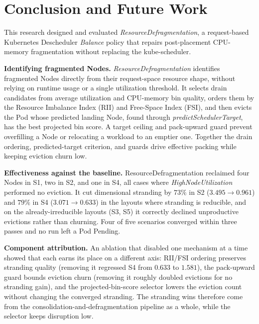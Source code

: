 \section{Conclusion and Future Work}
\label{bab:5}

This research designed and evaluated \textit{ResourceDefragmentation}, a request-based Kubernetes Descheduler \textit{Balance} policy that repairs post-placement CPU-memory fragmentation without replacing the kube-scheduler.

\textbf{Identifying fragmented Nodes.} \textit{ResourceDefragmentation} identifies fragmented Nodes directly from their request-space resource shape, without relying on runtime usage or a single utilization threshold. It selects drain candidates from average utilization and CPU-memory bin quality, orders them by the Resource Imbalance Index (RII) and Free-Space Index (FSI), and then evicts the Pod whose predicted landing Node, found through \textit{predictSchedulerTarget}, has the best projected bin score. A target ceiling and pack-upward guard prevent overfilling a Node or relocating a workload to an emptier one. Together the drain ordering, predicted-target criterion, and guards drive effective packing while keeping eviction churn low.

\textbf{Effectiveness against the baseline.} ResourceDefragmentation reclaimed four Nodes in S1, two in S2, and one in S4, all cases where \textit{HighNodeUtilization} performed no eviction. It cut dimensional stranding by \(73\%\) in S2 (\(3.495 \to 0.961\)) and \(79\%\) in S4 (\(3.071 \to 0.633\)) in the layouts where stranding is reducible, and on the already-irreducible layouts (S3, S5) it correctly declined unproductive evictions rather than churning. Four of five scenarios converged within three passes and no run left a Pod Pending.

\textbf{Component attribution.} An ablation that disabled one mechanism at a time showed that each earns its place on a different axis: RII/FSI ordering preserves stranding quality (removing it regressed S4 from \(0.633\) to \(1.581\)), the pack-upward guard bounds eviction churn (removing it roughly doubled evictions for no stranding gain), and the projected-bin-score selector lowers the eviction count without changing the converged stranding. The stranding wins therefore come from the consolidation-and-defragmentation pipeline as a whole, while the selector keeps disruption low.

